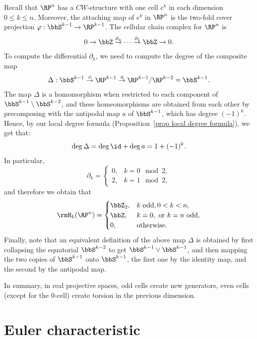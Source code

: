 \begin{example}
    Recall that $\RP^n$ has a $CW$-structure with one cell $e^k$ in each dimension $0\leq k\leq n$. Moreover, the attaching map of $e^k$ in $\RP^n$ is the two-fold cover projection $\varphi:\bbS^{k-1}\to \RP^{k-1}$. The cellular chain complex for $\RP^n$ is
    \[0\to \bbZ\overset{\partial_n}{\to}\cdots \overset{\partial_1}{\to}\bbZ\to 0.\]
    To compute the differential $\partial_k$, we need to compute the degree of the composite map
    \[\Delta:\bbS^{k-1}\overset{\varphi}{\to}\RP^{k-1}\overset{q}{\to}\RP^{k-1}\slash \RP^{k-2}=\bbS^{k-1}.\]
    The map $\Delta$ is a homomorphism when restricted to each component of $\bbS^{k-1}\setminus \bbS^{k-2}$, and these homeomorphisms are obtained from each other by precomposing with the antipodal map $a$ of $\bbS^{k-1}$, which has degree $(-1)^k$. Hence, by our local degree formula (Proposition~\ref{prop local degree formula}), we get that:
    \[\deg \Delta=\deg\id+\deg a=1+(-1)^k.\label{eq degree of cells in RPn}\]
    In particular,
    \[\partial_k=\begin{cases}
        0,& k=0\mod 2,\\
        2,& k=1\mod 2,
    \end{cases}\]
    and therefore we obtain that
    \[
        \rmH_k(\RP^n)=
        \begin{cases}
            \bbZ_2,& k\text{ odd}, 0<k<n,\\
            \bbZ,& k=0, \text{ or }k=n \text{ odd},\\
            0,&\text{otherwise}.
        \end{cases}
    \]
    Finally, note that an equivalent definition of the above map $\Delta$ is obtained by first collapsing the equatorial $\bbS^{k-2}$ to get $\bbS^{k-1}\vee \bbS^{k-1}$, and then mapping the two copies of $\bbS^{k-1}$ onto $\bbS^{k-1}$, the first one by the identity map, and the second by the antipodal map.

    In summary, in real projective spaces, odd cells create new generators, even cells (except for the 0-cell) create torsion in the previous dimension.
\end{example}





\section{Euler characteristic}

